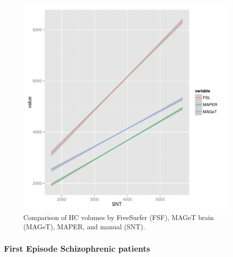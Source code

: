 \documentclass{article}\usepackage{graphicx, color}
\makeatletter
\def\maxwidth{ %
  \ifdim\Gin@nat@width>\linewidth
    \linewidth
  \else
    \Gin@nat@width
  \fi
}
\newenvironment{knitrout}{}{} %
\makeatother
\begin{document}
\begin{figure}[h]
\begin{knitrout}
\color{fgcolor}

{\centering \includegraphics[width=\maxwidth]{figure/ADNI-baseline-volumes-plot} 

}


\end{knitrout}

  \caption{Comparison of HC volumes by FreeSurfer (FSF), MAGeT brain (MAGeT), MAPER, and manual (SNT).}
  \label{ADNI-baseline-volumes-plot}
\end{figure}

\subsubsection{First Episode Schizophrenic patients}
\end{document}
